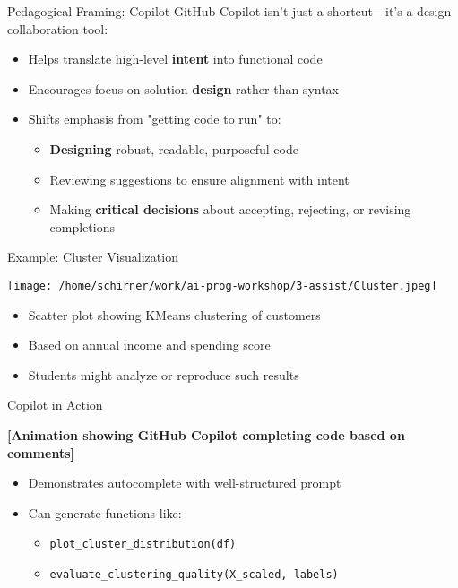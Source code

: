 \documentclass[xcolor={dvipsnames}, aspectratio=169]{beamer}
\begin{document}
\begin{frame}{Pedagogical Framing: Copilot}
  GitHub Copilot isn't just a shortcut—it's a design collaboration tool:
  \begin{itemize}
    \item Helps translate high-level \textbf{intent} into functional code
    \item Encourages focus on solution \textbf{design} rather than syntax
    \item Shifts emphasis from "getting code to run" to:
      \begin{itemize}
        \item \textbf{Designing} robust, readable, purposeful code
        \item Reviewing suggestions to ensure alignment with intent
        \item Making \textbf{critical decisions} about accepting, rejecting, or revising completions
      \end{itemize}
  \end{itemize}
\end{frame}

\begin{frame}{Example: Cluster Visualization}
  \begin{center}
    \texttt{[image: /home/schirner/work/ai-prog-workshop/3-assist/Cluster.jpeg]}
  \end{center}
  \begin{itemize}
    \item Scatter plot showing KMeans clustering of customers
    \item Based on annual income and spending score
    \item Students might analyze or reproduce such results
  \end{itemize}
\end{frame}

\begin{frame}{Copilot in Action}
  \begin{center}
    \textbf{[Animation showing GitHub Copilot completing code based on comments]}
  \end{center}
  \begin{itemize}
    \item Demonstrates autocomplete with well-structured prompt
    \item Can generate functions like:
      \begin{itemize}
        \item \texttt{plot\_cluster\_distribution(df)}
        \item \texttt{evaluate\_clustering\_quality(X\_scaled, labels)}
      \end{itemize}
  \end{itemize}
\end{frame}
\end{document}

